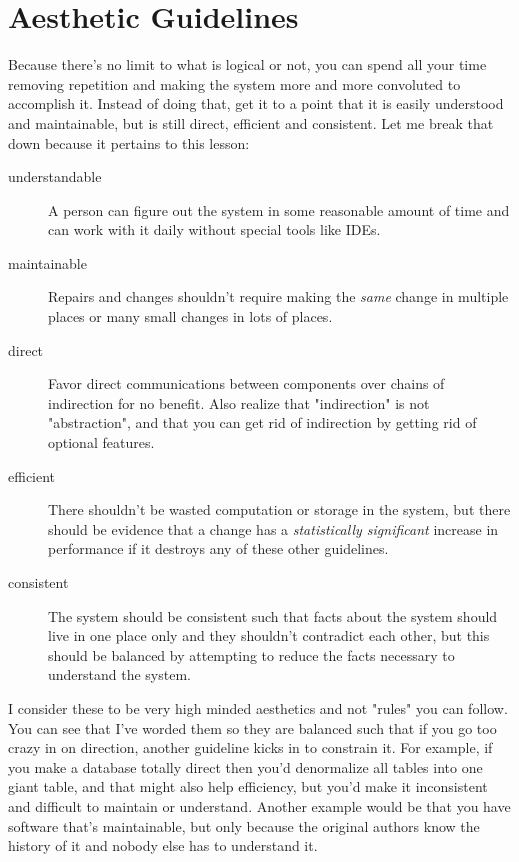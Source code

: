 \section{Aesthetic Guidelines}

Because there's no limit to what is logical or not, you can spend all your time
removing repetition and making the system more and more convoluted to
accomplish it.  Instead of doing that, get it to a point that it is easily
understood and maintainable, but is still direct, efficient and consistent.  Let me break
that down because it pertains to this lesson:

\begin{description}
\item [understandable] A person can figure out the system in some reasonable amount of time and
    can work with it daily without special tools like IDEs.
\item [maintainable] Repairs and changes shouldn't require making the \emph{same} change in multiple
    places or many small changes in lots of places.
\item [direct] Favor direct communications between components over chains of indirection
    for no benefit.  Also realize that "indirection" is not "abstraction", and that you 
    can get rid of indirection by getting rid of optional features.
\item [efficient] There shouldn't be wasted computation or storage in the system, but there
    should be evidence that a change has a \emph{statistically significant} increase in 
    performance if it destroys any of these other guidelines.
\item [consistent] The system should be consistent such that facts about the system should
    live in one place only and they shouldn't contradict each other, but this should be
    balanced by attempting to reduce the facts necessary to understand the system.
\end{description}

I consider these to be very high minded aesthetics and not "rules" you can follow.  You can
see that I've worded them so they are balanced such that if you go too crazy in on direction,
another guideline kicks in to constrain it.  For example, if you make a database totally 
direct then you'd denormalize all tables into one giant table, and that might also help
efficiency, but you'd make it inconsistent and difficult to maintain or understand.  Another
example would be that you have software that's maintainable, but only because the original
authors know the history of it and nobody else has to understand it.

